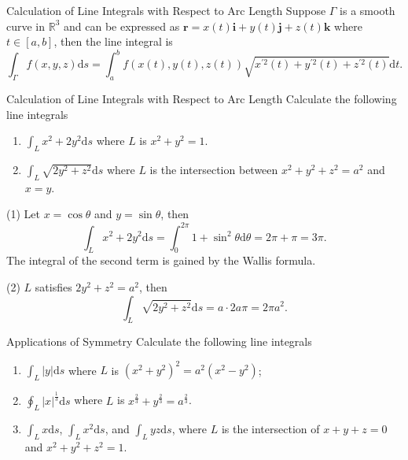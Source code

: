 \begin{proposition}{Calculation of Line Integrals with Respect to Arc Length}{}
  Suppose $\Gamma$ is a smooth curve in $\mathbb{R}^3$ and can be expressed as
  $\mathbf{r} = x(t)\mathbf{i} + y(t)\mathbf{j} + z(t)\mathbf{k}$ where $t \in
  [a, b]$, then the line integral is
  \begin{equation}
    \int_{\Gamma} f(x,y,z) \mathrm{d} s = \int_a^b f(x(t), y(t), z(t))
    \sqrt{x^{\prime 2}(t) + y^{\prime 2}(t) + z^{\prime 2}(t)}\mathrm{d} t.
  \end{equation}
\end{proposition}

\begin{example}{Calculation of Line Integrals with Respect to Arc Length}{}
  Calculate the following line integrals
  \begin{enumerate}
  \item $\int_L x^2 + 2y^2 \mathrm{d} s$ where $L$ is $x^2 + y^2 = 1$.
  \item $\int_L \sqrt{2y^2 + z^2}\mathrm{d}s$ where $L$ is the intersection
    between $x^2 + y^2 + z^2 = a^2$ and $x = y$.
  \end{enumerate}
\end{example}

\begin{solution}
  (1) Let $x = \cos \theta$ and $y = \sin \theta$, then
  \begin{equation}
    \int_L x^2 + 2y^2 \mathrm{d} s = \int_0^{2\pi} 1 + \sin^2 \theta \mathrm{d} \theta
    = 2\pi + \pi = 3\pi.
  \end{equation}
  The integral of the second term is gained by the Wallis formula.

  (2) $L$ satisfies $2y^2 + z^2 = a^2$,
  then
  \begin{equation}
    \int_L \sqrt{2y^2 + z^2}\mathrm{d} s = a \cdot 2a\pi = 2\pi a^2.
  \end{equation}
\end{solution}

\begin{example}{Applications of Symmetry}{}
  Calculate the following line integrals
  \begin{enumerate}
  \item $\int_L|y|\mathrm{d} s$ where $L$ is $(x^2 + y^2)^2 = a^2(x^2 - y^2)$;
  \item $\oint _L|x|^{\frac{1}{3}}\mathrm{d} s$ where
    $L$ is $x^{\frac{2}{3}} + y^{\frac{2}{3}} = a^{\frac{2}{3}}$.
  \item $\int_L x\mathrm{d} s$, $\int_L x^2\mathrm{d} s$, and
    $\int_Lyz\mathrm{d}s$, where $L$ is the intersection of
    $x+y+z=0$ and $x^2+y^2+z^2 = 1$.
  \end{enumerate}
\end{example}

